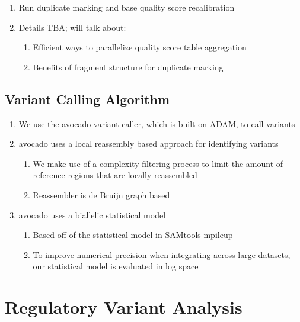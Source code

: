 \documentclass{nature}
\begin{document}
\begin{methods}
\begin{refsegment}
\begin{enumerate}
\item Run duplicate marking and base quality score recalibration
\item Details TBA; will talk about:
\begin{enumerate}
\item Efficient ways to parallelize quality score table aggregation
\item Benefits of fragment structure for duplicate marking
\end{enumerate}
\end{enumerate}

\subsection{Variant Calling Algorithm}
\label{sec:variant-calling-algorithm}

\begin{enumerate}
\item We use the avocado variant caller, which is built on ADAM, to call variants
\item avocado uses a local reassembly based approach for identifying variants
\begin{enumerate}
\item We make use of a complexity filtering process to limit the amount of reference
regions that are locally reassembled~\cite{bloniarz14}
\item Reassembler is de Bruijn graph based~\cite{pevzner01}
\end{enumerate}
\item avocado uses a biallelic statistical model
\begin{enumerate}
\item Based off of the statistical model in SAMtools mpileup~\cite{li11}
\item To improve numerical precision when integrating across large datasets, our
statistical model is evaluated in log space
\end{enumerate}
\end{enumerate}

\section{Regulatory Variant Analysis}
\label{sec:regulatory}


\end{refsegment}
\end{methods}
\end{document}
